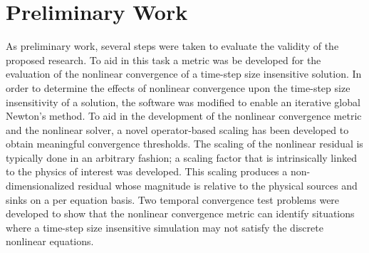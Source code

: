 \chapter{Preliminary Work}
\label{chap:prelim_work}
As preliminary work, several steps were taken to evaluate the validity of the proposed research.
To aid in this task a metric was be developed for the evaluation of the nonlinear convergence of a time-step size insensitive solution.
In order to determine the effects of nonlinear convergence upon the time-step size insensitivity of a solution, the \cobra{} software was modified to enable an iterative global Newton's method.
To aid in the development of the nonlinear convergence metric and the nonlinear solver, a novel operator-based scaling has been developed to obtain meaningful convergence thresholds.
The scaling of the nonlinear residual is typically done in an arbitrary fashion; a scaling factor that is intrinsically linked to the physics of interest was developed.
This scaling produces a non-dimensionalized residual whose magnitude is relative to the physical sources and sinks on a per equation basis. 
Two temporal convergence test problems were developed to show that the nonlinear convergence metric can identify situations where a time-step size insensitive simulation may not satisfy the discrete nonlinear equations.
